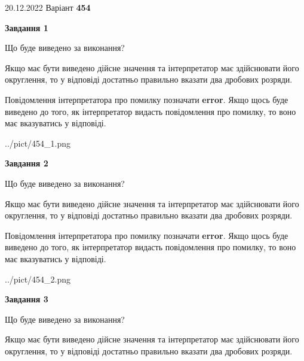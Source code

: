 \documentclass[12pt, ukrainian]{article}
\begin{document}
{20.12.2022 Варіант \No \textbf { 454 }\par}
{
\begin {Large}

{\begin {center}\textbf{Завдання 1}\end {center}}\par
Що буде виведено за виконання? \par

Якщо має бути виведено дійсне значення та інтерпретатор має здійснювати його округлення, 
то у відповіді достатньо правильно вказати два дробових розряди.

Повідомлення інтерпретатора про помилку позначати \textbf{error}.
Якщо щось буде виведено до того, як інтерпретатор видасть повідомлення про помилку, 
то воно має вказуватись у відповіді. \par

\begin{center}
	{../pict/454_1.png}
\end{center}
\newpage

{\begin {center}\textbf{Завдання 2}\end {center}}\par
Що буде виведено за виконання? \par

Якщо має бути виведено дійсне значення та інтерпретатор має здійснювати його округлення, 
то у відповіді достатньо правильно вказати два дробових розряди.

Повідомлення інтерпретатора про помилку позначати \textbf{error}.
Якщо щось буде виведено до того, як інтерпретатор видасть повідомлення про помилку, 
то воно має вказуватись у відповіді. \par

\begin{center}
	{../pict/454_2.png}
\end{center}
\newpage

{\begin {center}\textbf{Завдання 3}\end {center}}\par
Що буде виведено за виконання? \par

Якщо має бути виведено дійсне значення та інтерпретатор має здійснювати його округлення, 
то у відповіді достатньо правильно вказати два дробових розряди.


\end{Large}}
\end{document}
